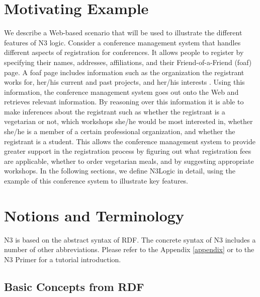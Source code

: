 \documentclass{tlp}
\begin{document}
\section{Motivating Example}

We describe a Web-based scenario that will be used to illustrate the
different features of N3 logic. Consider a conference management
system that handles different aspects of registration for
conferences. It allows people to register by specifying their names,
addresses, affiliations, and their Friend-of-a-Friend (foaf) page. A
foaf page includes information such as the organization the registrant
works for, her/his current and past projects, and her/his interests
\cite{foaf,foafintro}. Using this information, the conference
management system goes out onto the Web and retrieves relevant
information. By reasoning over this information it is able to make
inferences about the registrant such as whether the registrant is a
vegetarian or not, which workshops she/he would be most interested in,
whether she/he is a member of a certain professional organization, and
whether the registrant is a student. This allows the conference
management system to provide greater support in the registration
process by figuring out what registration fees are applicable, whether
to order vegetarian meals, and by suggesting appropriate workshops.
In the following sections, we define N3Logic in detail, using the
example of this conference system to illustrate key features. 

\section{Notions and Terminology}

N3 is based on the abstract syntax of RDF. The concrete syntax of N3
includes a number of other abbreviations.  Please refer to the
Appendix \ref{appendix} or to the N3 Primer \cite{bl05n3primer} for a
tutorial introduction.

\subsection{Basic Concepts from RDF}
\end{document}
